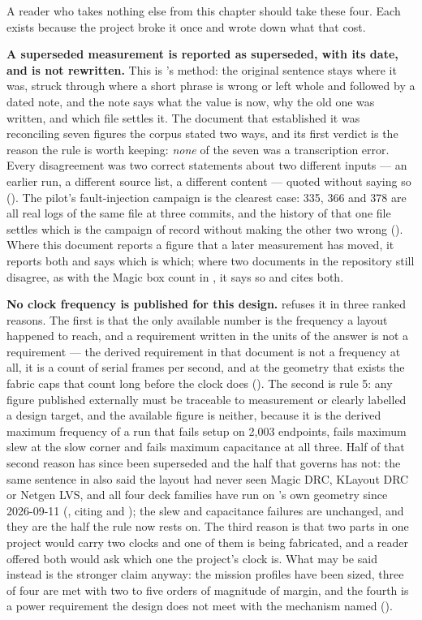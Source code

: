 A reader who takes nothing else from this chapter should take these
four. Each exists because the project broke it once and wrote down what
that cost.

\textbf{A superseded measurement is reported as superseded, with its
date, and is not rewritten.} This is 's method: the
original sentence stays where it was, struck through where a short
phrase is wrong or left whole and followed by a dated note, and the note
says what the value is now, why the old one was written, and which file
settles it. The document that established it was reconciling seven
figures the corpus stated two ways, and its first verdict is the reason
the rule is worth keeping: \emph{none} of the seven was a transcription
error. Every disagreement was two correct statements about two different
inputs --- an earlier run, a different source list, a different content
--- quoted without saying so (). The pilot's
fault-injection campaign is the clearest case: 335, 366 and 378 are all
real logs of the same file at three commits, and the history of that one
file settles which is the campaign of record without making the other
two wrong (). Where this document reports a
figure that a later measurement has moved, it reports both and says
which is which; where two documents in the repository still disagree, as
with the Magic box count in , it says so and cites
both.

\textbf{No clock frequency is published for this design.}
 refuses it in three ranked reasons. The first is
that the only available number is the frequency a layout happened to
reach, and a requirement written in the units of the answer is not a
requirement --- the derived requirement in that document is not a
frequency at all, it is a count of serial frames per second, and at the
geometry that exists the fabric caps that count long before the clock
does (). The second is 
rule 5: any figure published externally must be traceable to measurement
or clearly labelled a design target, and the available figure is
neither, because it is the derived maximum frequency of a run that fails
setup on 2{,}003 endpoints, fails maximum slew at the slow corner and
fails maximum capacitance at all three. Half of that second reason has
since been superseded and the half that governs has not: the same
sentence in  also said the layout had never seen
Magic DRC, KLayout DRC or Netgen LVS, and all four deck families have
run on 's own geometry since 2026-09-11
(, citing  and ); the slew
and capacitance failures are unchanged, and they are the half the rule
now rests on. The third reason is that two parts in
one project would carry two clocks and one of them is being fabricated,
and a reader offered both would ask which one the project's clock is.
What may be said instead is the stronger claim anyway: the mission
profiles have been sized, three of four are met with two to five orders
of magnitude of margin, and the fourth is a power requirement the design
does not meet with the mechanism named ().

